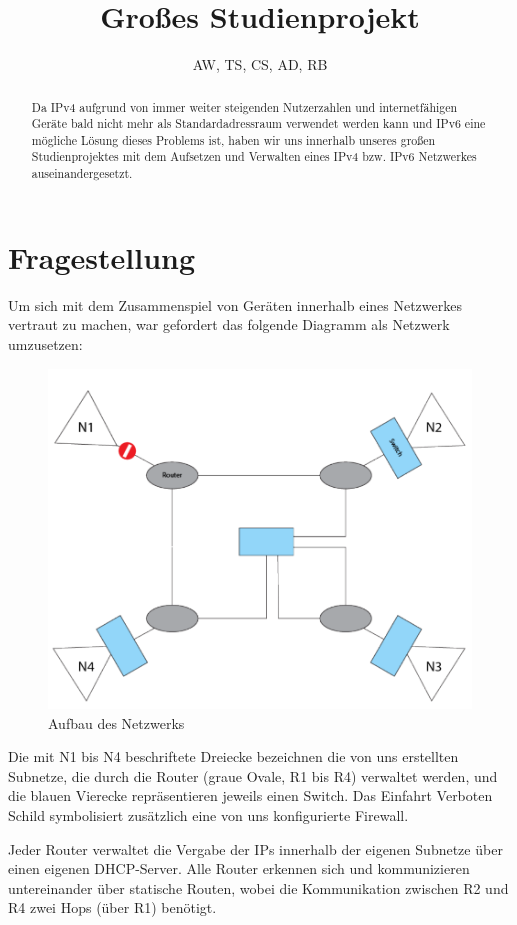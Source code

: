 \documentclass[11pt,a4paper]{article}
\author{AW, TS, CS, AD, RB}
\title{Großes Studienprojekt}
\begin{document}
\maketitle
\begin{abstract}
  Da IPv4 aufgrund von immer weiter steigenden Nutzerzahlen
  und internetfähigen Geräte bald nicht mehr als
  Standardadressraum verwendet werden kann und IPv6 eine
  mögliche Lösung dieses Problems ist, haben wir uns innerhalb
  unseres großen Studienprojektes mit dem Aufsetzen und
  Verwalten eines IPv4 bzw. IPv6 Netzwerkes
  auseinandergesetzt.
\end{abstract}
\section{Fragestellung}
Um sich mit dem Zusammenspiel von Geräten innerhalb eines
Netzwerkes vertraut zu machen, war gefordert das folgende
Diagramm als Netzwerk umzusetzen:
\begin{figure}[ht]
  \includegraphics[width=.8\linewidth]{./network_topography.png}
  \centering
  \caption{Aufbau des Netzwerks}
\end{figure}
\par
Die mit N1 bis N4 beschriftete Dreiecke bezeichnen die von uns
erstellten Subnetze, die durch die Router (graue Ovale, R1 bis R4)
verwaltet werden, und die blauen Vierecke repräsentieren jeweils einen
Switch. Das \glqq Einfahrt Verboten\grqq~ Schild symbolisiert
zusätzlich eine von uns konfigurierte Firewall.
\par
Jeder Router verwaltet die Vergabe der IPs innerhalb der eigenen
Subnetze über einen eigenen DHCP-Server. Alle Router erkennen sich und
kommunizieren untereinander über statische Routen, wobei die
Kommunikation zwischen R2 und R4 zwei Hops (über R1) benötigt.
\end{document}
